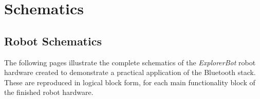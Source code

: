 \chapter{Schematics}
\label{app:schematics}

\section{Robot Schematics}

The following pages illustrate the complete schematics of the \emph{ExplorerBot} robot
hardware created to demonstrate a practical application of the Bluetooth stack. These
are reproduced in logical block form, for each main functionality block of the finished
robot hardware.



